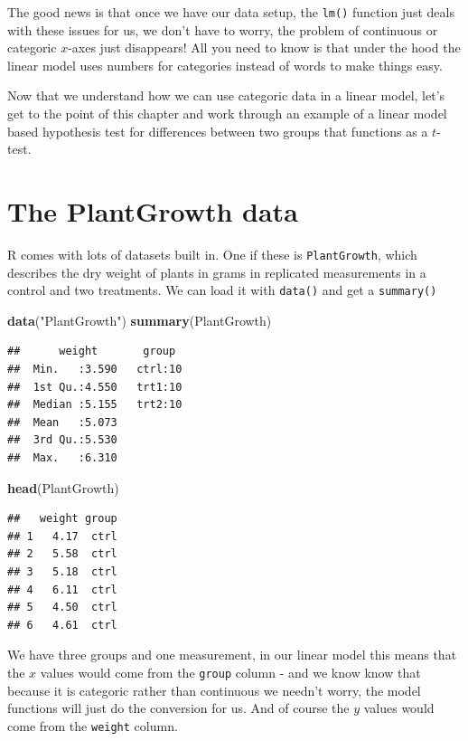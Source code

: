 \documentclass[
]{book}
\newenvironment{Shaded}{\begin{snugshade}}{\end{snugshade}}
\newcommand{\KeywordTok}[1]{\textcolor[rgb]{0.13,0.29,0.53}{\textbf{#1}}}
\newcommand{\NormalTok}[1]{#1}
\newcommand{\StringTok}[1]{\textcolor[rgb]{0.31,0.60,0.02}{#1}}
\begin{document}
The good news is that once we have our data setup, the \texttt{lm()} function just deals with these issues for us, we don't have to worry, the problem of continuous or categoric \(x\)-axes just disappears! All you need to know is that under the hood the linear model uses numbers for categories instead of words to make things easy.

Now that we understand how we can use categoric data in a linear model, let's get to the point of this chapter and work through an example of a linear model based hypothesis test for differences between two groups that functions as a \(t\)-test.

\hypertarget{the-plantgrowth-data}{%
\section{The PlantGrowth data}\label{the-plantgrowth-data}}

R comes with lots of datasets built in. One if these is \texttt{PlantGrowth}, which describes the dry weight of plants in grams in replicated measurements in a control and two treatments. We can load it with \texttt{data()} and get a \texttt{summary()}

\begin{Shaded}
\begin{Highlighting}[]
\KeywordTok{data}\NormalTok{(}\StringTok{"PlantGrowth"}\NormalTok{)}
\KeywordTok{summary}\NormalTok{(PlantGrowth)}
\end{Highlighting}
\end{Shaded}

\begin{verbatim}
##      weight       group   
##  Min.   :3.590   ctrl:10  
##  1st Qu.:4.550   trt1:10  
##  Median :5.155   trt2:10  
##  Mean   :5.073            
##  3rd Qu.:5.530            
##  Max.   :6.310
\end{verbatim}

\begin{Shaded}
\begin{Highlighting}[]
\KeywordTok{head}\NormalTok{(PlantGrowth)}
\end{Highlighting}
\end{Shaded}

\begin{verbatim}
##   weight group
## 1   4.17  ctrl
## 2   5.58  ctrl
## 3   5.18  ctrl
## 4   6.11  ctrl
## 5   4.50  ctrl
## 6   4.61  ctrl
\end{verbatim}

We have three groups and one measurement, in our linear model this means that the \(x\) values would come from the \texttt{group} column - and we know know that because it is categoric rather than continuous we needn't worry, the model functions will just do the conversion for us. And of course the \(y\) values would come from the \texttt{weight} column.
\end{document}

